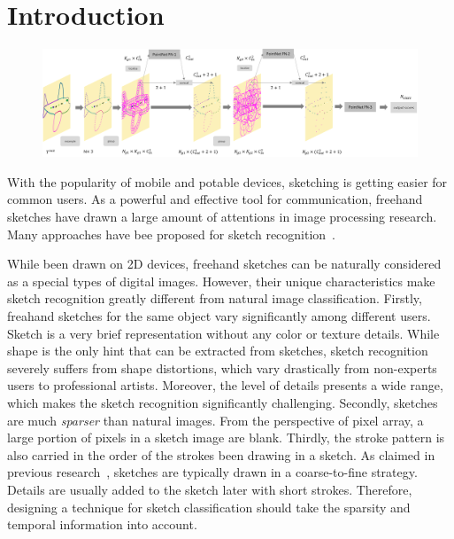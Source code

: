 \section{Introduction}
\label{sec:intro}

\begin{figure}
    \center
    \includegraphics[width=7in]{images/sketchpointnet.png}
    \label{fig:sketchpointnet}
\end{figure}

With the popularity of mobile and potable devices, sketching is getting easier for common users. As a powerful and effective tool for communication, freehand sketches have drawn a large amount of attentions in image processing research. 
Many approaches have bee proposed for sketch recognition~\cite{Eitz2012HowDH, LiHSG15, Schneider2014SketchCA, Yu2015SketchaNetTB, Seddati2015DeepSketchDC, Dupont2016DeepSketch2D}. 


While been drawn on 2D devices, freehand sketches can be naturally considered as a special types of digital images.
However, their unique characteristics make sketch recognition greatly different from natural image classification. 
%
Firstly, freahand sketches for the same object vary significantly among different users. 
Sketch is a very brief representation without any color or texture details. 
%
While shape is the only hint that can be extracted from sketches, sketch recognition severely suffers from shape distortions, which vary drastically from non-experts users to professional artists. 
Moreover, the level of details presents a wide range, which makes the sketch recognition significantly challenging.
%
Secondly, sketches are much \emph{sparser} than natural images. 
From the perspective of pixel array, a large portion of pixels in a sketch image are blank. 
Thirdly, the stroke pattern is also carried in the order of the strokes been drawing in a sketch. As claimed in previous research~\cite{Eitz2012HowDH}, sketches are typically drawn in a coarse-to-fine strategy. Details are usually added to the sketch later with short strokes. 
Therefore, designing a technique for sketch classification should take the sparsity and temporal information into account. 



